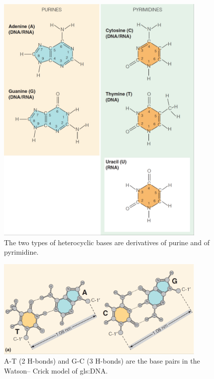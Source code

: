 \documentclass[]{article}
\begin{document}
\begin{figure}[H]
	\caption{The two types of heterocyclic bases are
		derivatives of purine and of pyrimidine.}\label{fig:Nucleobases} 
	\includegraphics[width=0.9\textwidth]{Nucleobases}
\end{figure}

\begin{figure}[H]
	\caption{A-T (2 H-bonds) and G-C (3 H-bonds) are the base pairs in the Watson–
		Crick model of \gls{gls:DNA}.}\label{fig:BasePairs} 
	\includegraphics[width=0.9\textwidth]{BasePairs}
\end{figure}
\end{document}
